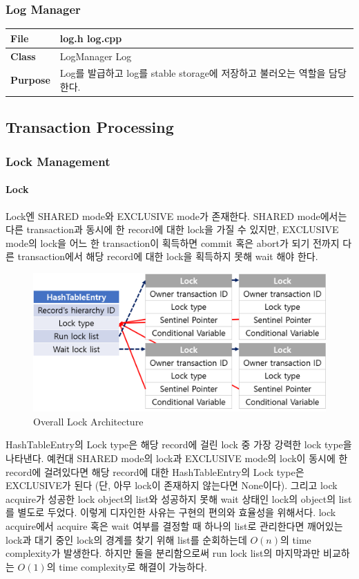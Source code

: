 \documentclass[main.tex]{subfiles}
\begin{document}
\subsubsection{Log Manager}
\begin{table}[!htb]
	\begin{tabularx}{\textwidth}{|l|X|}
		\hline
		\textbf{File} & log.h log.cpp \\
		\hline
		\textbf{Class} & LogManager Log \\
		\hline
		\textbf{Purpose} & Log를 발급하고 log를 stable storage에 저장하고 불러오는 역할을 담당한다. \\
		\hline
	\end{tabularx}
\end{table}

\subsection{Transaction Processing}

\subsubsection{Lock Management}
\paragraph{Lock}
Lock엔 SHARED mode와 EXCLUSIVE mode가 존재한다.
SHARED mode에서는 다른 transaction과 동시에 한 record에 대한 lock을 가질 수 있지만,
EXCLUSIVE mode의 lock을 어느 한 transaction이 획득하면 commit 혹은 abort가 되기 전까지 다른 transaction에서 해당 record에 대한 lock을 획득하지 못해 wait 해야 한다.

\begin{figure}[!hbt]
	\centering
	\includegraphics[width=.7\textwidth]{images/cc/lock_structure.png}
	\caption{Overall Lock Architecture}
\end{figure}

HashTableEntry의 Lock type은 해당 record에 걸린 lock 중 가장 강력한 lock type을 나타낸다.
예컨대 SHARED mode의 lock과 EXCLUSIVE mode의 lock이 동시에 한 record에 걸려있다면 해당 record에 대한 HashTableEntry의 Lock type은 EXCLUSIVE가 된다
(단, 아무 lock이 존재하지 않는다면 None이다).
그리고 lock acquire가 성공한 lock object의 list와 성공하지 못해 wait 상태인 lock의 object의 list를 별도로 두었다.
이렇게 디자인한 사유는 구현의 편의와 효율성을 위해서다.
lock acquire에서 acquire 혹은 wait 여부를 결정할 때 하나의 list로 관리한다면 깨어있는 lock과 대기 중인 lock의 경계를 찾기 위해 list를 순회하는데 $O(n)$의 time complexity가 발생한다.
하지만 둘을 분리함으로써 run lock list의 마지막과만 비교하는 $O(1)$의 time complexity로 해결이 가능하다.
\end{document}
